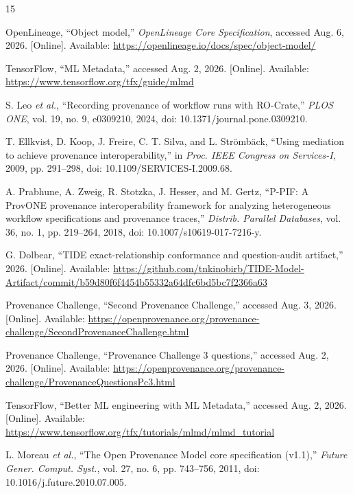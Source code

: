 \documentclass[conference]{IEEEtran}
\theoremstyle{tideproposition}
\begin{document}
\begin{thebibliography}{15}
\setlength{\itemsep}{0pt}
\setlength{\parskip}{0pt}

OpenLineage, ``Object model,'' \emph{OpenLineage Core Specification}, accessed Aug. 6, 2026. [Online]. Available: \url{https://openlineage.io/docs/spec/object-model/}

TensorFlow, ``ML Metadata,'' accessed Aug. 2, 2026. [Online]. Available: \url{https://www.tensorflow.org/tfx/guide/mlmd}

S. Leo \emph{et al.}, ``Recording provenance of workflow runs with RO-Crate,''
\emph{PLOS ONE}, vol. 19, no. 9, e0309210, 2024, doi: 10.1371/journal.pone.0309210.

T. Ellkvist, D. Koop, J. Freire, C. T. Silva, and L. Str\"omb\"ack,
``Using mediation to achieve provenance interoperability,''
in \emph{Proc. IEEE Congress on Services-I}, 2009, pp. 291--298, doi: 10.1109/SERVICES-I.2009.68.

A. Prabhune, A. Zweig, R. Stotzka, J. Hesser, and M. Gertz,
``P-PIF: A ProvONE provenance interoperability framework for analyzing heterogeneous workflow specifications and provenance traces,''
\emph{Distrib. Parallel Databases}, vol. 36, no. 1, pp. 219--264, 2018, doi: 10.1007/s10619-017-7216-y.

G. Dolbear, ``TIDE exact-relationship conformance and question-audit artifact,'' 2026. [Online]. Available: \url{https://github.com/tnkinobirb/TIDE-Model-Artifact/commit/b59d80f6f4454b55332a64dfc6bd5bc7f2366a63}

Provenance Challenge, ``Second Provenance Challenge,'' accessed Aug. 3, 2026. [Online]. Available: \url{https://openprovenance.org/provenance-challenge/SecondProvenanceChallenge.html}

Provenance Challenge, ``Provenance Challenge 3 questions,'' accessed Aug. 2, 2026. [Online]. Available: \url{https://openprovenance.org/provenance-challenge/ProvenanceQuestionsPc3.html}

TensorFlow, ``Better ML engineering with ML Metadata,'' accessed Aug. 2, 2026. [Online]. Available: \url{https://www.tensorflow.org/tfx/tutorials/mlmd/mlmd_tutorial}

L. Moreau \emph{et al.}, ``The Open Provenance Model core specification (v1.1),''
\emph{Future Gener. Comput. Syst.}, vol. 27, no. 6, pp. 743--756, 2011, doi: 10.1016/j.future.2010.07.005.


\end{thebibliography}
\end{document}
